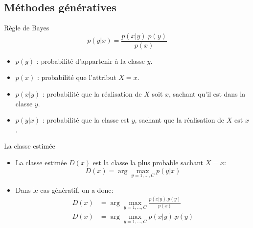 \documentclass[8pt]{beamer}
\begin{document}
		\subsection{Méthodes génératives}
			\begin{frame}{Règle de Bayes}
				\begin{equation}
					p(y \vert x) = \frac{p(x \vert y).p(y)}{p(x)}
				\end{equation}
				\begin{itemize}
					\item $p(y)$ : probabilité d'appartenir à la classe $y$.
					\item $p(x)$ : probabilité que l'attribut $X=x$.
					\item $p(x \vert y)$  : probabilité que la réalisation de $X$ soit $x$, sachant qu'il est dans la classe $y$.
					\item $p(y \vert x)$  : probabilité que la classe est $y$, sachant que la réalisation de $X$ est $x$.
				\end{itemize}
			\end{frame}
			\begin{frame}{La classe estimée}
				\begin{itemize}
					\item<1-> La classe estimée \(D(x)\) est la classe la plus probable sachant $X=x$: 
						\begin{equation}
							D(x) = \arg \max_{y=1,\dots,C} p(y \vert x)
						\end{equation}
					\item<2-> Dans le cas génératif, on a donc:
						\begin{align}
							D(x) &= \arg \max_{y=1,\dots,C} \frac{p(x \vert y).p(y)}{p(x)}\\
							D(x) &= \arg \max_{y=1,\dots,C} p(x \vert y).p(y)
						\end{align}
				\end{itemize}
			\end{frame}
\end{document}
